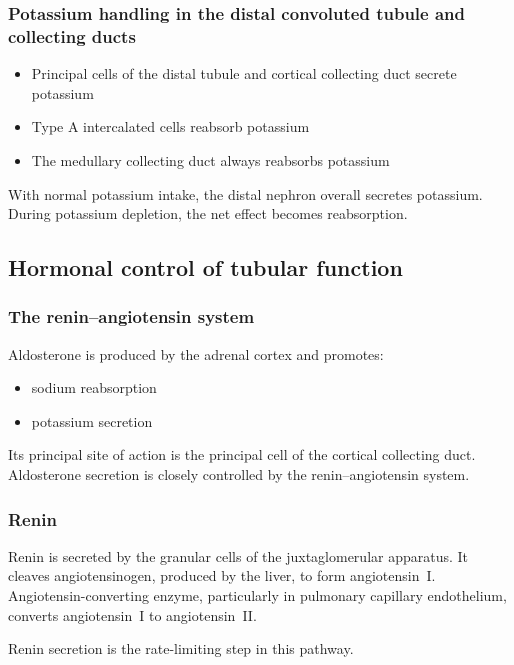 \documentclass[11pt,a4paper]{article}
\begin{document}
\subsubsection{Potassium handling in the distal convoluted tubule and collecting ducts}

\begin{itemize}
    \item Principal cells of the distal tubule and cortical collecting duct secrete potassium
    \item Type A intercalated cells reabsorb potassium
    \item The medullary collecting duct always reabsorbs potassium
\end{itemize}

With normal potassium intake, the distal nephron overall secretes potassium. During potassium depletion, the net effect becomes reabsorption.

\subsection{Hormonal control of tubular function}

\subsubsection{The renin--angiotensin system}

Aldosterone is produced by the adrenal cortex and promotes:
\begin{itemize}
    \item sodium reabsorption
    \item potassium secretion
\end{itemize}

Its principal site of action is the principal cell of the cortical collecting duct. Aldosterone secretion is closely controlled by the renin--angiotensin system.

\subsubsection{Renin}

Renin is secreted by the granular cells of the juxtaglomerular apparatus. It cleaves angiotensinogen, produced by the liver, to form angiotensin~I. Angiotensin-converting enzyme, particularly in pulmonary capillary endothelium, converts angiotensin~I to angiotensin~II.

Renin secretion is the rate-limiting step in this pathway.
\end{document}
